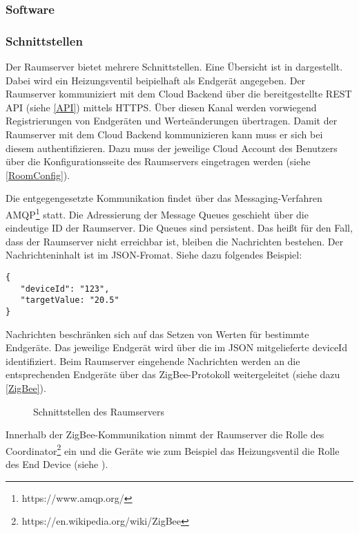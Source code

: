 \subsubsection{Software}\label{Raum_Software}

\subsubsection{Schnittstellen}\label{Raum_Schnittstellen}
Der Raumserver bietet mehrere Schnittstellen. Eine Übersicht ist in  dargestellt. Dabei wird ein Heizungsventil beipielhaft als Endgerät angegeben.
Der Raumserver kommuniziert mit dem Cloud Backend über die bereitgestellte REST API (siehe \autoref{API}) mittels HTTPS. Über diesen Kanal werden vorwiegend Registrierungen von Endgeräten und Werteänderungen übertragen. Damit der Raumserver mit dem Cloud Backend kommunizieren kann muss er sich bei diesem authentifizieren. Dazu muss der jeweilige Cloud Account des Benutzers über die Konfigurationsseite des Raumservers eingetragen werden (siehe \autoref{RoomConfig}).

Die entgegengesetzte Kommunikation findet über das Messaging-Verfahren AMQP\footnote{https://www.amqp.org/} statt. Die Adressierung der Message Queues geschieht über die eindeutige ID der Raumserver. Die Queues sind persistent. Das heißt für den Fall, dass der Raumserver nicht erreichbar ist, bleiben die Nachrichten bestehen. Der Nachrichteninhalt ist im JSON-Fromat. Siehe dazu folgendes Beispiel:
\vspace{2em}
\begin{lstlisting}
{
   "deviceId": "123",
   "targetValue: "20.5"
}

\end{lstlisting}
\vspace{2em}
Nachrichten beschränken sich auf das Setzen von Werten für bestimmte Endgeräte. Das jeweilige Endgerät wird über die im JSON mitgelieferte deviceId identifiziert. Beim Raumserver eingehende Nachrichten werden an die entsprechenden Endgeräte über das ZigBee-Protokoll weitergeleitet (siehe dazu \autoref{ZigBee}). 

\begin{figure}[htb]
\centering
{}
\caption{Schnittstellen des Raumservers}
\label{fig:RSSS}
\end{figure}

Innerhalb der ZigBee-Kommunikation nimmt der Raumserver die Rolle des Coordinator\footnote{https://en.wikipedia.org/wiki/ZigBee} ein und die Geräte wie zum Beispiel das Heizungsventil die Rolle des End Device (siehe ).


